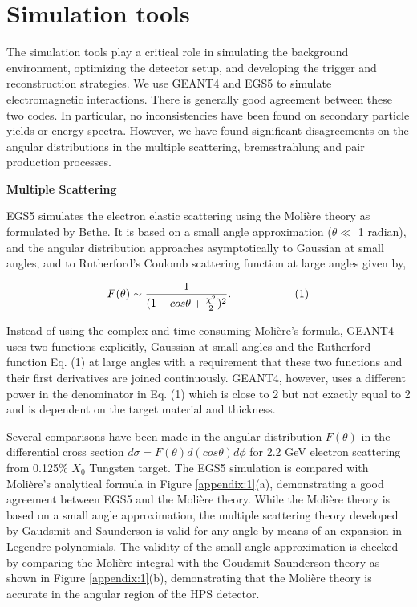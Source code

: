 \appendix
\section{Simulation tools}
\label{app:sim}

The simulation tools play a critical role in simulating the background
environment, optimizing the detector setup, and developing the trigger 
and reconstruction strategies. We use GEANT4 and EGS5 to simulate 
electromagnetic interactions. There is generally good agreement 
between these two codes. In particular, no inconsistencies have been 
found on secondary particle yields or energy spectra. However, we have found 
significant disagreements on the angular distributions in the multiple
scattering, bremsstrahlung and pair production processes.  

\vspace{1cm}
\noindent
{\bf Multiple Scattering}

EGS5 simulates the electron elastic scattering using the Moli\`{e}re theory 
\cite{moliere} as formulated by Bethe. \cite{bethe}
It is based on a small angle approximation
($\theta \ll$ 1 radian), and the angular distribution approaches asymptotically
to Gaussian at small angles, and to Rutherford's Coulomb scattering function at 
large angles given by, 

$$ F(\theta) \sim  { 1 \over {(1-cos\theta + {\chi^2 \over 2})^2}}.    \hspace{2 cm} (1) $$

Instead of using the complex and time consuming Moli\`{e}re's formula,
GEANT4 uses two functions explicitly, Gaussian at small angles and the
Rutherford function Eq. (1) at large angles with a requirement that these two
functions and their first derivatives are joined continuously. 
GEANT4, however, uses a different power
in the denominator in Eq. (1) which is close to 2 but not exactly equal to 2 and is 
dependent on the target material and thickness.

Several comparisons have been made in the angular distribution $F(\theta)$ in the
differential cross section $d\sigma=F(\theta)d(cos\theta) d\phi$ for 2.2 GeV electron
scattering from 0.125\% $X_0$ Tungsten target. 
The EGS5 simulation is compared with Moli\`{e}re's analytical formula 
in Figure \ref{appendix:1}(a), demonstrating a good agreement between EGS5 and
the Moli\`{e}re theory.
While the Moli\`{e}re theory is based on a small angle approximation,
the multiple scattering theory developed by Gaudsmit and Saunderson is valid 
for any angle by means of an expansion in Legendre polynomials. \cite{gs}
The validity of the small angle approximation is checked by comparing the 
Moli\`{e}re integral with 
the Goudsmit-Saunderson theory as shown in Figure \ref{appendix:1}(b),
demonstrating that the Moli\`{e}re theory is accurate in the angular region
of the HPS detector. 

